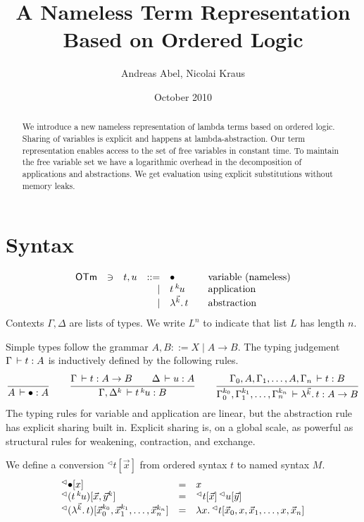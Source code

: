 \documentclass[a4paper]{article}
\title{A Nameless Term Representation Based on Ordered Logic}
\author{Andreas Abel, Nicolai Kraus}
\institute{
  Department of Computer Science \\
  Ludwig-Maximilians-University Munich \\ 
  \email{andreas.abel@ifi.lmu.de}
}
\date{October 2010}
\newcommand{\OTm}{\mathsf{OTm}}
\newcommand{\oann}[1]{{}^{#1}\kern-0.15ex}
\newcommand{\ovar}{\mathord{\bullet}}
\newcommand{\oapp}[1]{\,\oann{#1}}
\newcommand{\olam}[1]{\lambda^{#1}.\,}
\newcommand{\oprint}[2]{{}^{\lhd}\esubst{#1}{#2}}
\newcommand{\oprintp}[2]{\oprint{(#1)}{#2}}
\renewcommand{\esubst}[2]{#1[#2]}
\begin{document}
\maketitle

\begin{abstract}
  We introduce a new nameless representation of lambda terms based on
  ordered logic.  Sharing of variables is explicit and happens at
  lambda-abstraction.  Our term representation enables access to the
  set of free variables in constant time.  To maintain the free
  variable set we have a logarithmic overhead in the decomposition of
  applications and abstractions. 
  We get evaluation using
  explicit substitutions without memory leaks.  
\end{abstract}

\section{Syntax}

\[
\begin{array}{lllrl@{\qquad}l}
\OTm & \ni & t,u & ::= & \ovar & \mbox{variable (nameless)} \\
&&& \mid & t \oapp k u & \mbox{application} \\
&&& \mid & \olam {\vec k} t & \mbox{abstraction} \\
\end{array}
\]
Contexts $\Gamma,\Delta$ are lists of types.  We write $L^n$ to
indicate that list $L$ has length $n$.

  Simple types follow the grammar $A, B ::= X
\mid A \to B$. The typing judgement $\Gamma \,\vdash t : A$ is inductively
defined by the following rules.
\begin{gather*}
  \ru{}{A \der \ovar : A}
\qquad
  \ru{\Gamma \der t : A \to B \qquad
      \Delta \der u : A
    }{\Gamma,\Delta^k \der t \oapp k u : B}
\qquad
  \ru{\Gamma_0,A,\Gamma_1,\dots,A,\Gamma_n \der t : B
    }{\Gamma_0^{k_0},\Gamma_1^{k_1},\dots,\Gamma_n^{k_n} \der 
        \olam {\vec k} t : A \to B} 
\end{gather*}
The typing rules for variable and application are linear, but the
abstraction rule has explicit sharing built in.  Explicit sharing is,
on a global scale, as powerful as structural rules for weakening,
contraction, and exchange.

  We define a conversion $\oprint t {\vec x}$ 
from ordered syntax $t$ to named syntax $M$.
\[
\begin{array}{lll}
  \oprint \ovar x 
    & = & x \\
  \oprintp {t \oapp k u} {\vec x,\vec y^k} 
    & = & \oprint t {\vec x} \, \oprint u {\vec y} \\
  \oprintp {\olam {\vec k} t} 
    {\vec x_0^{k_0},\vec x_1^{k_1},\dots,\vec x_n^{k_n}}
    & = & \lambda x.\, \oprint t {\vec x_0,x,\vec x_1,\dots,x,\vec x_n} \\
\end{array}
\]
\end{document}
